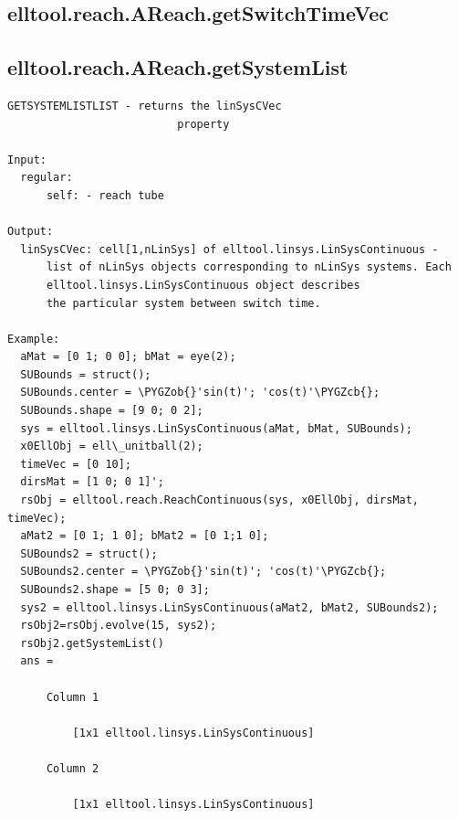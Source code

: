 \documentclass[letterpaper,10pt,english]{sphinxmanual}
\def\PYGZob{\char`\{}
\def\PYGZcb{\char`\}}
\begin{document}
\subsection{elltool.reach.AReach.getSwitchTimeVec}
\label{chap_functions:elltool-reach-areach-getswitchtimevec}

\subsection{elltool.reach.AReach.getSystemList}
\label{chap_functions:elltool-reach-areach-getsystemlist}
\begin{Verbatim}[commandchars=\\\{\}]
GETSYSTEMLISTLIST - returns the linSysCVec
                          property

Input:
  regular:
      self: - reach tube

Output:
  linSysCVec: cell[1,nLinSys] of elltool.linsys.LinSysContinuous -
      list of nLinSys objects corresponding to nLinSys systems. Each
      elltool.linsys.LinSysContinuous object describes
      the particular system between switch time.

Example:
  aMat = [0 1; 0 0]; bMat = eye(2);
  SUBounds = struct();
  SUBounds.center = \PYGZob{}'sin(t)'; 'cos(t)'\PYGZcb{};
  SUBounds.shape = [9 0; 0 2];
  sys = elltool.linsys.LinSysContinuous(aMat, bMat, SUBounds);
  x0EllObj = ell\_unitball(2);
  timeVec = [0 10];
  dirsMat = [1 0; 0 1]';
  rsObj = elltool.reach.ReachContinuous(sys, x0EllObj, dirsMat, timeVec);
  aMat2 = [0 1; 1 0]; bMat2 = [0 1;1 0];
  SUBounds2 = struct();
  SUBounds2.center = \PYGZob{}'sin(t)'; 'cos(t)'\PYGZcb{};
  SUBounds2.shape = [5 0; 0 3];
  sys2 = elltool.linsys.LinSysContinuous(aMat2, bMat2, SUBounds2);
  rsObj2=rsObj.evolve(15, sys2);
  rsObj2.getSystemList()
  ans =

      Column 1

          [1x1 elltool.linsys.LinSysContinuous]

      Column 2

          [1x1 elltool.linsys.LinSysContinuous]
\end{Verbatim}
\end{document}
